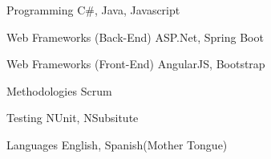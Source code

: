


\begin{cvskills}


\cvskill
{Programming} %
{C\#, Java, Javascript} %


\cvskill
{Web Frameworks (Back-End)} %
{ASP.Net, Spring Boot} %

\cvskill
{Web Frameworks (Front-End)} %
{AngularJS, Bootstrap} %


\cvskill
{Methodologies}
{Scrum}

\cvskill
{Testing}
{NUnit, NSubsitute}

\cvskill
{Languages} %
{English, Spanish(Mother Tongue)} %

\end{cvskills}